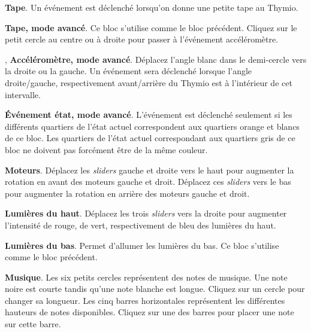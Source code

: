 \bigskip\bigskip\bigskip

 \textbf{Tape}. Un événement est déclenché lorsqu'on donne une petite tape au Thymio.

\bigskip\bigskip\bigskip

 \textbf{Tape, mode avancé}.
Ce bloc s'utilise comme le bloc précédent.
Cliquez sur le petit cercle au centre ou à droite pour passer à l'événement accéléromètre.

\bigskip\bigskip

,  \textbf{Accéléromètre, mode avancé}.
Déplacez l'angle blanc dans le demi-cercle vers la droite ou la gauche.
Un événement sera déclenché lorsque l'angle droite/gauche, respectivement avant/arrière 
du Thymio est à l'intérieur de cet intervalle.

\bigskip\bigskip\bigskip\bigskip

 \textbf{Événement état, mode avancé}.
L'événement est déclenché seulement si les différents quartiers de l'état actuel
correspondent aux quartiers orange et blancs de ce bloc.
Les quartiers de l'état actuel correspondant aux quartiers gris de ce bloc ne doivent pas forcément
être de la même couleur.

\bigskip


 \textbf{Moteurs}.
Déplacez les \emph{sliders} gauche et droite vers le haut pour augmenter la rotation en avant des
moteurs gauche et droit.
Déplacez ces \emph{sliders} vers le bas pour augmenter la rotation en arrière des moteurs
gauche et droit.

\bigskip\bigskip

 \textbf{Lumières du haut}.
Déplacez les trois \emph{sliders} vers la droite pour augmenter l'intensité de rouge, de vert,
respectivement de bleu des lumières du haut.

\bigskip\bigskip

 \textbf{Lumières du bas}.
Permet d'allumer les lumières du bas. Ce bloc s'utilise comme le bloc précédent.

\bigskip\bigskip\bigskip\bigskip

 \textbf{Musique}.
Les six petits cercles représentent des notes de musique.
Une note noire est courte tandis qu'une note blanche est longue.
Cliquez sur un cercle pour changer sa longueur.
Les cinq barres horizontales représentent les différentes hauteurs de notes disponibles.
Cliquez sur une des barres pour placer une note sur cette barre.

